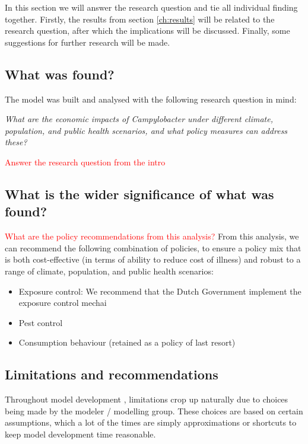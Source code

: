 In this section we will answer the research question and tie all individual finding together. Firstly, the results from section \ref{ch:results} will be related to the research question, after which the implications will be discussed. Finally, some suggestions for further research will be made. 

\subsection{What was found?}

The model was built and analysed with the following research question in mind: 

\begin{center}\textit{\textcolor{NiceBlue}{
What are the economic impacts of Campylobacter under different climate, population, and public health scenarios, and what policy measures can address these? }}
\end{center}


\textcolor{red}{Answer the research question from the intro}


\subsection{What is the wider significance of what was found?}
\textcolor{red}{What are the policy recommendations from this analysis?}
From this analysis, we can recommend the following combination of policies, to ensure a policy mix that is both cost-effective (in terms of ability to reduce cost of illness) and robust to a range of climate, population, and public health scenarios:
\begin{itemize}
    \item Exposure control: We recommend that the Dutch Government implement the exposure control mechai
    \item Pest control
    \item Consumption behaviour (retained as a policy of last resort)
\end{itemize}

\subsection{Limitations and recommendations}

Throughout model development , limitations crop up naturally due to choices being made by the modeler / modelling group. These choices are based on certain assumptions, which a lot of the times are simply approximations or shortcuts to keep model development time reasonable.

